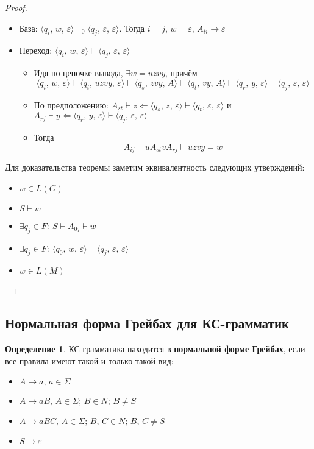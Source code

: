 \documentclass[a4paper,12pt]{article}
\theoremstyle{plain}
\theoremstyle{definition}
\newtheorem{definition}{Определение}[subsection]
\theoremstyle{remark}
\begin{document}
\begin{proof}
\begin{itemize}
		\item База: $\langle q_i,\, w,\, \varepsilon\rangle \vdash_0\langle q_j,\, \varepsilon,\, \varepsilon\rangle$. Тогда $i = j,\, w =\varepsilon,\, A_{ii} \to \varepsilon$
		\item Переход: $\langle q_i,\, w,\, \varepsilon\rangle\vdash\langle q_j,\, \varepsilon,\, \varepsilon\rangle$
		      \begin{itemize}
			      \item Идя по цепочке вывода, $\exists w = uzvy$, причём
			            \[
				            \langle q_i,\, w,\, \varepsilon\rangle \vdash \langle q_i,\, uzvy,\, \varepsilon\rangle \vdash \langle q_s,\, zvy,\, A\rangle \vdash \langle q_t,\, vy,\, A\rangle \vdash \langle q_r,\, y,\, \varepsilon\rangle \vdash \langle q_j,\, \varepsilon,\, \varepsilon\rangle
			            \]
			      \item По предположению: $A_{st} \vdash z \Leftarrow \langle q_s,\, z,\, \varepsilon\rangle \vdash\langle q_t,\, \varepsilon,\, \varepsilon\rangle$ и $A_{rj} \vdash y \Leftarrow \langle q_r,\, y,\, \varepsilon\rangle\vdash\langle q_j,\, \varepsilon,\, \varepsilon\rangle$
			      \item Тогда
			            \[
				            A_{ij} \vdash uA_{st}vA_{rj} \vdash uzvy = w
			            \]
		      \end{itemize}
	\end{itemize}
	Для доказательства теоремы заметим эквивалентность следующих утверждений:
	\begin{itemize}
		\item $w \in L(G)$
		\item $S \vdash w$
		\item $\exists q_j \in F :\: S \vdash A_{0j} \vdash w$
		\item $\exists q_j \in F :\: \langle q_0,\,w,\,\varepsilon\rangle\vdash\langle q_j,\,\varepsilon,\,\varepsilon\rangle$
		\item $w \in L(M)$
	\end{itemize}
\end{proof}

\subsection{Нормальная форма Грейбах для КС-грамматик}
\begin{definition}
	КС-грамматика находится в \textbf{нормальной форме Грейбах}, если все правила имеют такой и только такой вид:
	\begin{itemize}
		\item $A \to a,\, a \in \Sigma$
		\item $A \to aB,\, A \in \Sigma;\, B \in N;\, B \neq S$
		\item $A \to aBC,\, A \in \Sigma;\, B,\, C \in N;\, B,\, C \neq S$
		\item $S \to \varepsilon$
	\end{itemize}
\end{definition}
\end{document}
